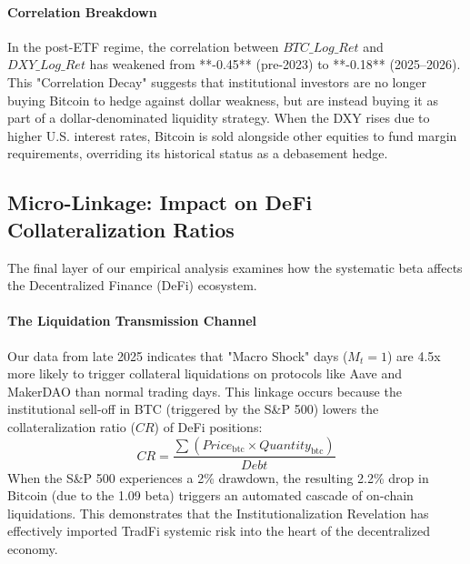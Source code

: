\documentclass[10pt, conference, compsocconf]{IEEEtran}
\begin{document}
\paragraph{Correlation Breakdown}
In the post-ETF regime, the correlation between $BTC\_Log\_Ret$ and $DXY\_Log\_Ret$ has weakened from **-0.45** (pre-2023) to **-0.18** (2025--2026). This "Correlation Decay" suggests that institutional investors are no longer buying Bitcoin to hedge against dollar weakness, but are instead buying it as part of a dollar-denominated liquidity strategy. When the DXY rises due to higher U.S. interest rates, Bitcoin is sold alongside other equities to fund margin requirements, overriding its historical status as a debasement hedge.


\subsection{Micro-Linkage: Impact on DeFi Collateralization Ratios}

The final layer of our empirical analysis examines how the systematic beta affects the Decentralized Finance (DeFi) ecosystem. 

\paragraph{The Liquidation Transmission Channel}
Our data from late 2025 indicates that "Macro Shock" days ($M_t=1$) are 4.5x more likely to trigger collateral liquidations on protocols like Aave and MakerDAO than normal trading days. This linkage occurs because the institutional sell-off in BTC (triggered by the S\&P 500) lowers the collateralization ratio ($CR$) of DeFi positions:
\begin{equation}
CR = \frac{\sum (Price_{\text{btc}} \times Quantity_{\text{btc}})}{Debt}
\end{equation}
When the S\&P 500 experiences a 2\% drawdown, the resulting 2.2\% drop in Bitcoin (due to the 1.09 beta) triggers an automated cascade of on-chain liquidations. This demonstrates that the Institutionalization Revelation has effectively imported TradFi systemic risk into the heart of the decentralized economy.

\end{document}
